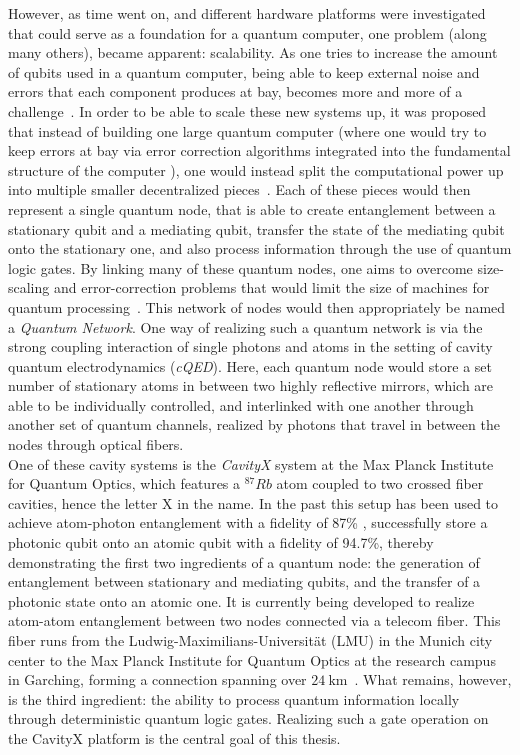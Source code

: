 However, as time went on, and different hardware platforms were investigated that could serve as a foundation for a quantum computer, one problem (along many others), became apparent: scalability. As one tries to increase the amount of qubits used in a quantum computer, being able to keep external noise and errors that each component produces at bay, becomes more and more of a challenge~\cite{ScalabilityProblemQC}. In order to be able to scale these new systems up, it was proposed that instead of building one large quantum computer (where one would try to keep errors at bay via error correction algorithms integrated into the fundamental structure of the computer \cite{GoogleErrorCorrection}), one would instead split the computational power up into multiple smaller decentralized pieces~\cite{DuanKimble2004,QuantumInternetKimble2008,Monroe2014}. Each of these pieces would then represent a single quantum node, that is able to create entanglement between a stationary qubit and a mediating qubit, transfer the state of the mediating qubit onto the stationary one, and also process information through the use of quantum logic gates. By linking many of these quantum nodes, one aims to overcome size-scaling and error-correction problems that would limit the size of machines for quantum processing~\cite{QuantumInternetKimble2008,ScalableQCArchitecture_silicon_based}. This network of nodes would then appropriately be named a \textit{Quantum Network}. One way of realizing such a quantum network is via the strong coupling interaction of single photons and atoms in the setting of cavity quantum electrodynamics (\textit{cQED}). Here, each quantum node would store a set number of stationary atoms in between two highly reflective mirrors, which are able to be individually controlled, and interlinked with one another through another set of quantum channels, realized by photons that travel in between the nodes through optical fibers.\\

One of these cavity systems is the \textit{CavityX} system at the Max Planck Institute for Quantum Optics, which features a $^{87}Rb$ atom coupled to two crossed fiber cavities, hence the letter X in the name. In the past this setup has been used to achieve atom-photon entanglement with a fidelity of 87\% \cite{HeraldedEntanglement}, successfully store a photonic qubit onto an atomic qubit with a fidelity of 94.7\%\cite{QuantumNetworkManuel}, thereby demonstrating the first two ingredients of a quantum node: the generation of entanglement between stationary and mediating qubits, and the transfer of a photonic state onto an atomic one. It is currently being developed to realize atom-atom entanglement between two nodes connected via a telecom fiber. This fiber runs from the Ludwig-Maximilians-Universität (LMU) in the Munich city center to the Max Planck Institute for Quantum Optics at the research campus in Garching, forming a connection spanning over $\SI{24}{\kilo\metre}$~\cite{TelecomConnectionMPQLMU}. What remains, however, is the third ingredient: the ability to process quantum information locally through deterministic quantum logic gates. Realizing such a gate operation on the CavityX platform is the central goal of this thesis.\\

